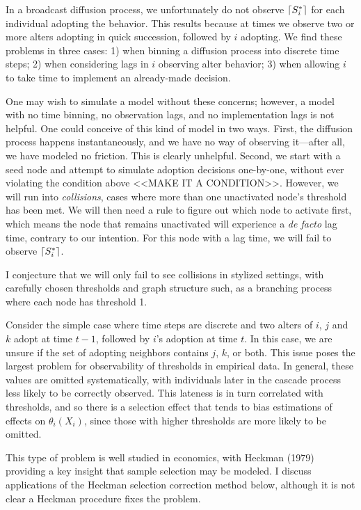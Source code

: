 \documentclass{article}
\DeclarePairedDelimiter{\ceil}{\lceil}{\rceil}
\begin{document}
In a broadcast diffusion process, we unfortunately do not observe $\ceil{S_i^*}$ for each individual adopting the behavior. This results because at times we observe two or more alters adopting in quick succession, followed by $i$ adopting. We find these problems in three cases: 1) when binning a diffusion process into discrete time steps; 2) when considering lags in $i$ observing alter behavior; 3) when allowing $i$ to take time to implement an already-made decision.

One may wish to simulate a model without these concerns; however, a model with no time binning, no observation lags, and no implementation lags is not helpful. One could conceive of this kind of model in two ways. First, the diffusion process happens instantaneously, and we have no way of observing it---after all, we have modeled no friction. This is clearly unhelpful. Second, we start with a seed node and attempt to simulate adoption decisions one-by-one, without ever violating the condition above <<MAKE IT A CONDITION>>. However, we will run into \emph{collisions}, cases where more than one unactivated node's threshold has been met. We will then need a rule to figure out which node to activate first, which means the node that remains unactivated will experience a \emph{de facto} lag time, contrary to our intention. For this node with a lag time, we will fail to observe $\ceil{S_i^*}$.

I conjecture that we will only fail to see collisions in stylized settings, with carefully chosen thresholds and graph structure such, as a branching process where each node has threshold 1.

Consider the simple case where time steps are discrete and two alters of $i$, $j$ and $k$ adopt at time $t - 1$, followed by $i$'s adoption at time $t$. In this case, we are unsure if the set of adopting neighbors contains $j$, $k$, or both. This issue poses the largest problem for observability of thresholds in empirical data. In general, these values are omitted systematically, with individuals later in the cascade process less likely to be correctly observed. This lateness is in turn correlated with thresholds, and so there is a selection effect that tends to bias estimations of effects on $\theta_i(X_i)$, since those with higher thresholds are more likely to be omitted.

This type of problem is well studied in economics, with Heckman (1979) providing a key insight that sample selection may be modeled. I discuss applications of the Heckman selection correction method below, although it is not clear a Heckman procedure fixes the problem.
\end{document}
